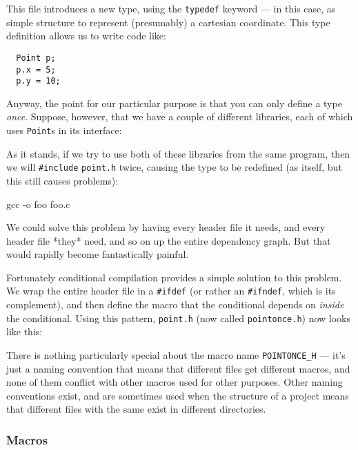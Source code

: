 \documentclass[a4paper,10pt]{article}
\newcommand{\kw}[1]{\texttt{#1}}
\newcommand{\filename}[1]{\texttt{#1}}
\newcommand{\drmcode}[3]{\noindent\begin{minipage}{\columnwidth}\end{minipage}}
\newcommand{\cfile}[1]{\drmcode{C}{\filename{#1}}{#1}}
\begin{document}
\cfile{point.h}

\noindent
This file introduces a new type, using the \kw{typedef} keyword --- in
this case, as simple structure to represent (presumably) a cartesian
coordinate. This type definition allows us to write code like:

\begin{lstlisting}
  Point p;
  p.x = 5;
  p.y = 10;
\end{lstlisting}

\noindent
Anyway, the point for our particular purpose is that you can only
define a type \emph{once}. Suppose, however, that we have a couple of
different libraries, each of which uses \kw{Point}s in its interface:

\cfile{geometry.h}

\cfile{drawing.h}

\noindent
As it stands, if we try to use both of these libraries from the same
program, then we will \verb!#include! \filename{point.h} twice,
causing the type to be redefined (as itself, but this still causes
problems):

\cfile{foo.c}

gcc -o foo foo.c
\END

\noindent
We could solve this problem by having every header file it needs, and every
header file *they* need, and so on up the entire dependency graph. But
that would rapidly become fantastically painful.

Fortunately conditional compilation provides a simple solution to this
problem. We wrap the entire header file in a \verb!#ifdef! (or rather
an \verb!#ifndef!, which is its complement), and then define the macro
that the conditional depends on \emph{inside} the conditional. Using
this pattern, \filename{point.h} (now called \filename{pointonce.h})
now looks like this:

\cfile{pointonce.h}

There is nothing particularly special about the macro name
\verb!POINTONCE_H! --- it's just a naming convention that means that
different files get different macros, and none of them conflict with
other macros used for other purposes. Other naming conventions exist,
and are sometimes used when the structure of a project means that
different files with the same exist in different directories.

\subsubsection{Macros}
\label{sec:macros}
\end{document}
